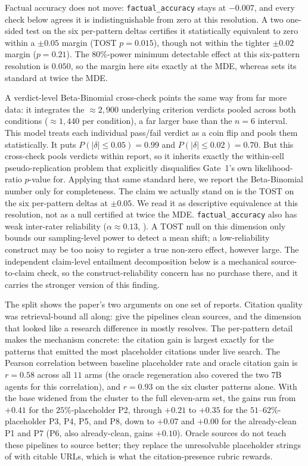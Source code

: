\documentclass[11pt]{article}
\newcommand{\dimrow}[1]{\texttt{#1}}
\begin{document}
Factual accuracy does not move: \dimrow{factual\_accuracy} stays at $-0.007$, and every check
below agrees it is indistinguishable from zero at this resolution. A two one-sided test on the
six per-pattern deltas certifies it
statistically equivalent to zero within a $\pm0.05$ margin (TOST $p{=}0.015$), though not
within the tighter $\pm0.02$ margin ($p{=}0.21$). The $80\%$-power minimum detectable effect
at this six-pattern resolution is $0.050$, so the margin here sits exactly at the MDE, whereas
 sets its standard at twice the MDE.

A verdict-level Beta-Binomial cross-check points the same way from far more data: it integrates
the $\approx\!2{,}900$ underlying criterion verdicts pooled across both conditions
($\approx\!1{,}440$ per condition), a far larger base than the $n{=}6$ interval. This model
treats each individual pass/fail verdict as a coin flip and pools them statistically. It
puts $P(|\delta|\leq0.05)=0.99$ and $P(|\delta|\leq0.02)=0.70$. But this cross-check pools
verdicts within report, so it inherits exactly the within-cell pseudo-replication problem
that  explicitly disqualifies Gate~1's own likelihood-ratio $p$-value for.
Applying that same standard here, we report the Beta-Binomial number only for completeness.
The claim we actually stand on is the TOST on the six per-pattern deltas at $\pm0.05$. We read it
as descriptive equivalence at this resolution, not as a null certified at twice the MDE.
\dimrow{factual\_accuracy} also has weak
inter-rater reliability ($\alpha\approx0.13$, ). A TOST null on this
dimension only bounds our sampling-level power to detect a mean shift; a low-reliability
construct may be too noisy to register a true non-zero effect, however large. The
independent claim-level entailment decomposition below is a mechanical source-to-claim
check, so the construct-reliability concern has no purchase there, and it carries the
stronger version of this finding.

The split shows the paper's two arguments on one set of
reports. Citation quality was retrieval-bound all along: give the
pipelines clean sources, and the dimension that looked like a research difference in
 mostly resolves. The per-pattern detail makes the mechanism concrete: the
citation gain is largest exactly for the patterns that emitted the most placeholder citations
under live search. The Pearson correlation between baseline placeholder rate and oracle
citation gain is $r=0.58$ across all $11$ arms (the oracle regeneration also covered the two
7B agents for this correlation), and $r=0.93$ on the six cluster patterns alone. With the
base widened from the cluster to the full eleven-arm set, the gains run
from $+0.41$ for the $25\%$-placeholder P2, through $+0.21$ to $+0.35$ for the $51$--$62\%$-placeholder
P3, P4, P5, and P8, down to $+0.07$ and $+0.00$ for the already-clean P1 and P7 (P6, also
already-clean, gains $+0.10$). Oracle sources
do not teach these pipelines to source better; they replace the unresolvable placeholder strings
of  with citable URLs, which is what the citation-presence rubric rewards.
\end{document}
